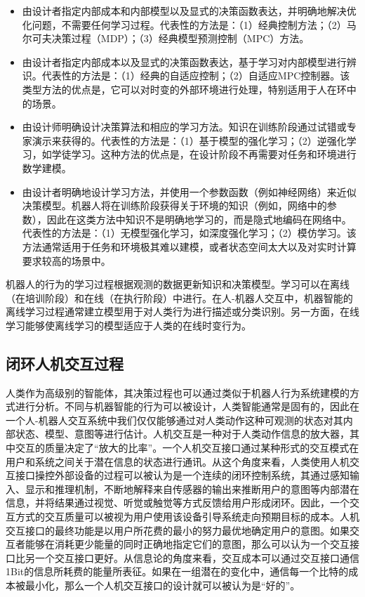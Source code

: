 \begin{itemize}
\item 由设计者指定内部成本和内部模型以及显式的决策函数表达，并明确地解决优化问题，不需要任何学习过程。代表性的方法是：（1）经典控制方法；（2）马尔可夫决策过程（MDP）；（3）经典模型预测控制（MPC）方法。
\item 由设计者指定内部成本以及显式的决策函数表达，基于学习对内部模型进行辨识。代表性的方法是：（1）经典的自适应控制；（2）自适应MPC控制器。该类型方法的优点是，它可以对时变的外部环境进行处理，特别适用于人在环中的场景。
\item 由设计师明确设计决策算法和相应的学习方法。知识在训练阶段通过试错或专家演示来获得的。代表性的方法是：（1）基于模型的强化学习；（2）逆强化学习，如学徒学习。这种方法的优点是，在设计阶段不再需要对任务和环境进行数学建模。
\item 由设计者明确地设计学习方法，并使用一个参数函数（例如神经网络）来近似决策模型。机器人将在训练阶段获得关于环境的知识（例如，网络中的参数），因此在这类方法中知识不是明确地学习的，而是隐式地编码在网络中。代表性的方法是：（1）无模型强化学习，如深度强化学习；（2）模仿学习。该方法通常适用于任务和环境极其难以建模，或者状态空间太大以及对实时计算要求较高的场景中。
\end{itemize}

机器人的行为的学习过程根据观测的数据更新知识和决策模型。学习可以在离线（在培训阶段）和在线（在执行阶段）中进行。在人-机器人交互中，机器智能的离线学习过程通常建立模型用于对人类行为进行描述或分类识别。另一方面，在线学习能够使离线学习的模型适应于人类的在线时变行为。
\subsection{闭环人机交互过程}
人类作为高级别的智能体，其决策过程也可以通过类似于机器人行为系统建模的方式进行分析。不同与机器智能的行为可以被设计，人类智能通常是固有的，因此在一个人-机器人交互系统中我们仅仅能够通过对人类动作这种可观测的状态对其内部状态、模型、意图等进行估计。人机交互是一种对于人类动作信息的放大器，其中交互的质量决定了``放大的比率''\cite{williamsonContinuousUncertainInteraction2006}。一个人机交互接口通过某种形式的交互模式在用户和系统之间关于潜在信息的状态进行通讯。从这个角度来看，人类使用人机交互接口操控外部设备的过程可以被认为是一个连续的闭环控制系统，其通过感知输入、显示和推理机制，不断地解释来自传感器的输出来推断用户的意图等内部潜在信息，并将结果通过视觉、听觉或触觉等方式反馈给用户形成闭环。因此，一个交互方式的交互质量可以被视为用户使用该设备引导系统走向预期目标的成本。人机交互接口的最终功能是以用户所花费的最小的努力最优地确定用户的意图。如果交互者能够在消耗更少能量的同时正确地指定它们的意图，那么可以认为一个交互接口比另一个交互接口更好。从信息论的角度来看，交互成本可以通过交互接口通信1Bit的信息所耗费的能量所表征。如果在一组潜在的变化中，通信每一个比特的成本被最小化，那么一个人机交互接口的设计就可以被认为是``好的''。

